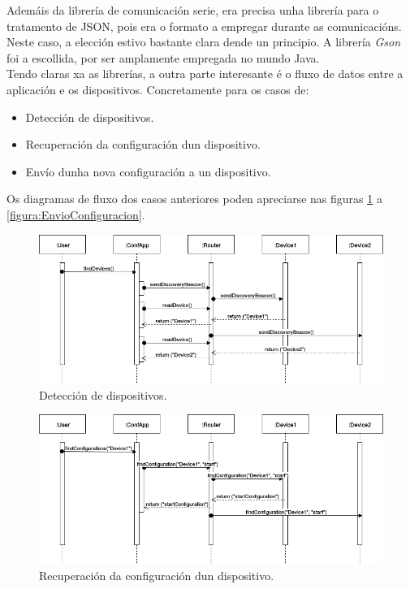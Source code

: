    Ademáis da librería de comunicación serie, era precisa unha librería para o
   tratamento de JSON, pois era o formato a empregar durante as
   comunicacións. \\
   
   Neste caso, a elección estivo bastante clara dende un principio. A librería 
   \textit{Gson} \cite{Gson} foi a escollida, por ser amplamente empregada no
   mundo Java. \\
   
   Tendo claras xa as librerías, a outra parte interesante é o fluxo de datos
   entre a aplicación e os dispositivos. Concretamente para os casos de:
   
   \begin{itemize}
    \item Detección de dispositivos.
    \item Recuperación da configuración dun dispositivo.
    \item Envío dunha nova configuración a un dispositivo.
   \end{itemize}
   
   Os diagramas de fluxo dos casos anteriores poden apreciarse nas figuras
   \ref{figura:DeteccionDispositivos} a \ref{figura:EnvioConfiguracion}. \\
   
   \begin{figure}[htbp]
    \centering
    \includegraphics[scale=0.5, keepaspectratio=true]{./imagenes/df-find-devices.png}
    \caption{Detección de dispositivos.}
    \label{figura:DeteccionDispositivos}
   \end{figure}
   
   \begin{figure}[htbp]
    \centering
    \includegraphics[scale=0.5, keepaspectratio=true]{./imagenes/df-select-device.png}
    \caption{Recuperación da configuración dun dispositivo.}
    \label{figura:RecuperacionConfiguracion}
   \end{figure}
   
